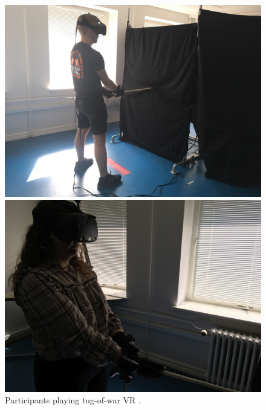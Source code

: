 \begin{figure}[H]
  \centering
  \captionsetup{justification=centering,margin=0.1cm}
\hspace*{\fill}
  \begin{minipage}[b]{0.4\textwidth}
    \includegraphics[width=\textwidth]{Images/Participants/m1.jpg}
  \end{minipage}
  \hfill
  \begin{minipage}[b]{0.4\textwidth}
    \includegraphics[width=\textwidth]{Images/Participants/f3.JPG}
  \end{minipage}
\hspace*{\fill}
     \caption{Participants playing tug-of-war VR  .}
     \label{fig:participants}
\end{figure}
